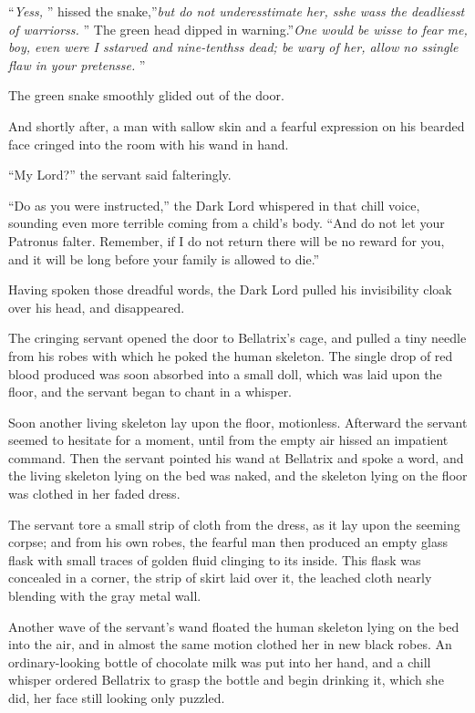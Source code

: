 ``\emph{Yess,} '' hissed the snake,''\emph{but do not underesstimate her,
sshe wass the deadliesst of warriorss.} '' The green head dipped in
warning.''\emph{One would be wisse to fear me, boy, even were I sstarved
and nine-tenthss dead; be wary of her, allow no ssingle flaw in your
pretensse.} ''

The green snake smoothly glided out of the door.

And shortly after, a man with sallow skin and a fearful expression on
his bearded face cringed into the room with his wand in hand.

``My Lord?'' the servant said falteringly.

``Do as you were instructed,'' the Dark Lord whispered in that chill
voice, sounding even more terrible coming from a child's body. ``And do
not let your Patronus falter. Remember, if I do not return there will be
no reward for you, and it will be long before your family is allowed to
die.''

Having spoken those dreadful words, the Dark Lord pulled his
invisibility cloak over his head, and disappeared.

The cringing servant opened the door to Bellatrix's cage, and pulled a
tiny needle from his robes with which he poked the human skeleton. The
single drop of red blood produced was soon absorbed into a small doll,
which was laid upon the floor, and the servant began to chant in a
whisper.

Soon another living skeleton lay upon the floor, motionless. Afterward
the servant seemed to hesitate for a moment, until from the empty air
hissed an impatient command. Then the servant pointed his wand at
Bellatrix and spoke a word, and the living skeleton lying on the bed was
naked, and the skeleton lying on the floor was clothed in her faded
dress.

The servant tore a small strip of cloth from the dress, as it lay upon
the seeming corpse; and from his own robes, the fearful man then
produced an empty glass flask with small traces of golden fluid clinging
to its inside. This flask was concealed in a corner, the strip of skirt
laid over it, the leached cloth nearly blending with the gray metal
wall.

Another wave of the servant's wand floated the human skeleton lying on
the bed into the air, and in almost the same motion clothed her in new
black robes. An ordinary-looking bottle of chocolate milk was put into
her hand, and a chill whisper ordered Bellatrix to grasp the bottle and
begin drinking it, which she did, her face still looking only puzzled.

